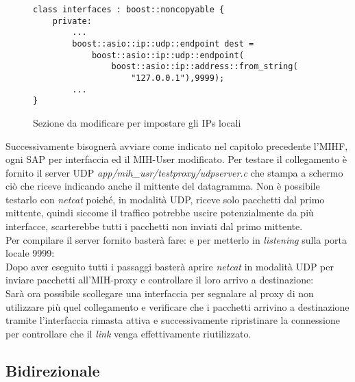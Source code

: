 \begin{figure}
\begin{verbatim}
class interfaces : boost::noncopyable {
    private:
        ...
        boost::asio::ip::udp::endpoint dest = 
            boost::asio::ip::udp::endpoint(
                boost::asio::ip::address::from_string(
                    "127.0.0.1"),9999);
        ...
}
\end{verbatim}
\caption{Sezione da modificare per impostare gli IPs locali}
\label{fig:sourcecode}
\end{figure}
Successivamente bisognerà avviare come indicato nel capitolo precedente l'MIHF, ogni SAP per interfaccia ed il MIH-User modificato. Per testare il collegamento è fornito il server UDP {\em app/mih\_usr/testproxy/udpserver.c} che stampa a schermo ciò che riceve indicando anche il mittente del datagramma. Non è possibile testarlo con {\em netcat}\cite{netcat} poiché, in modalità UDP, riceve solo pacchetti dal primo mittente, quindi siccome il traffico potrebbe uscire potenzialmente da più interfacce, scarterebbe tutti i pacchetti non inviati dal primo mittente. \\Per compilare il server fornito basterà fare:
e per metterlo in {\em listening} sulla porta locale 9999:
\\
Dopo aver eseguito tutti i passaggi basterà aprire {\em netcat} in modalità UDP per inviare pacchetti all'MIH-proxy e controllare il loro arrivo a destinazione:
\\
Sarà ora possibile scollegare una interfaccia per segnalare al proxy di non utilizzare più quel collegamento e verificare che i pacchetti arrivino a destinazione tramite l'interfaccia rimasta attiva e successivamente ripristinare la connessione per controllare che il {\em link} venga effettivamente riutilizzato.

\subsection{Bidirezionale}

